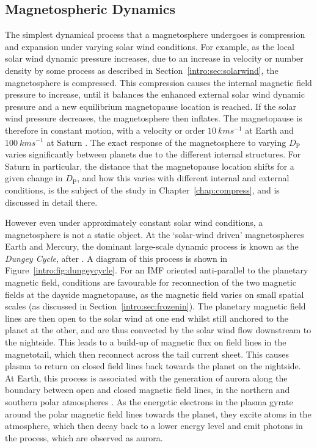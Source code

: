 \subsection{Magnetospheric Dynamics}\label{intro:sec:dynamics}
The simplest dynamical process that a magnetosphere undergoes is compression and expansion under varying solar wind conditions. For example, as the local solar wind dynamic pressure increases, due to an increase in velocity or number density by some process as described in Section~\ref{intro:sec:solarwind}, the magnetosphere is compressed. This compression causes the internal magnetic field pressure to increase, until it balances the enhanced external solar wind dynamic pressure and a new equilibrium magnetopause location is reached. If the solar wind pressure decreases, the magnetosphere then inflates. The magnetopause is therefore in constant motion, with a velocity or order $\SI{10}{kms^{-1}}$ at Earth \citep{berchem1982} and $\SI{100}{kms^{-1}}$ at Saturn \citep{masters2011}. The exact response of the magnetosphere to varying $D_\mathrm{P}$ varies significantly between planets due to the different internal structures. For Saturn in particular, the distance that the magnetopause location shifts for a given change in $D_\mathrm{P}$, and how this varies with different internal and external conditions, is the subject of the study in Chapter~\ref{chap:compress}, and is discussed in detail there.

However even under approximately constant solar wind conditions, a magnetosphere is not a static object. At the `solar-wind driven' magnetospheres Earth and Mercury, the dominant large-scale dynamic process is known as the \textit{Dungey Cycle}, after \citet{dungey1961}. A diagram of this process is shown in Figure~\ref{intro:fig:dungeycycle}. For an IMF oriented anti-parallel to the planetary magnetic field, conditions are favourable for reconnection of the two magnetic fields at the dayside magnetopause, as the magnetic field varies on small spatial scales (as discussed in Section~\ref{intro:sec:frozenin}). The planetary magnetic field lines are then open to the solar wind at one end whilst still anchored to the planet at the other, and are thus convected by the solar wind flow downstream to the nightside. This leads to a build-up of magnetic flux on field lines in the magnetotail, which then reconnect across the tail current sheet. This causes plasma to return on closed field lines back towards the planet on the nightside. At Earth, this process is associated with the generation of aurora along the boundary between open and closed magnetic field lines, in the northern and southern polar atmospheres \citep[e.g.][]{milan2007}. As the energetic electrons in the plasma gyrate around the polar magnetic field lines towards the planet, they excite atoms in the atmosphere, which then decay back to a lower energy level and emit photons in the process, which are observed as aurora.


